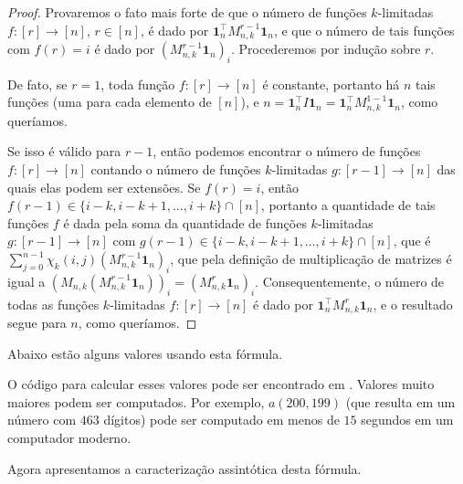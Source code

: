 \documentclass[a4paper,12pt]{article}
\theoremstyle{definition}
\begin{document}
\begin{proof}

  Provaremos o fato mais forte de que o número de funções $k$-limitadas $f : [r] \to [n]$, $r \in [n]$, é dado por $\mathbf{1}_n^\intercal M_{n,k}^{r - 1} \mathbf{1}_n$, e que o número de tais funções com $f(r) = i$ é dado por $(M_{n,k}^{r - 1} \mathbf{1}_n)_i$. Procederemos por indução sobre $r$.

  De fato, se $r = 1$, toda função $f : [r] \to [n]$ é constante, portanto há $n$ tais funções (uma para cada elemento de $[n]$), e $n = \mathbf{1}_n^\intercal I \mathbf{1}_n = \mathbf{1}_n^\intercal M_{n,k}^{1 - 1} \mathbf{1}_n$, como queríamos.

  Se isso é válido para $r - 1$, então podemos encontrar o número de funções $f : [r] \to [n]$ contando o número de funções $k$-limitadas $g : [r-1] \to [n]$ das quais elas podem ser extensões. Se $f(r) = i$, então $f(r - 1) \in \{i - k, i - k + 1, \dots, i + k\} \cap [n]$, portanto a quantidade de tais funções $f$ é dada pela soma da quantidade de funções $k$-limitadas $g : [r-1] \to [n]$ com $g(r-1) \in \{i - k, i - k + 1, \dots, i + k\} \cap [n]$, que é $\sum_{j = 0}^{n-1} \chi_k(i, j) (M_{n,k}^{r-1} \mathbf{1}_n)_i$, que pela definição de multiplicação de matrizes é igual a $(M_{n,k} (M_{n,k}^{r-1} \mathbf{1}_n))_i = (M_{n,k}^r \mathbf{1}_n)_i$. Consequentemente, o número de todas as funções $k$-limitadas $f : [r] \to [n]$ é dado por $\mathbf{1}_n^\intercal M_{n,k}^r \mathbf{1}_n$, e o resultado segue para $n$, como queríamos.

\end{proof}

Abaixo estão alguns valores usando esta fórmula.



O código para calcular esses valores pode ser encontrado em \cite{github}. Valores muito maiores podem ser computados. Por exemplo, $a(200,199)$ (que resulta em um número com $463$ dígitos) pode ser computado em menos de $15$ segundos em um computador moderno.

Agora apresentamos a caracterização assintótica desta fórmula.
\end{document}
